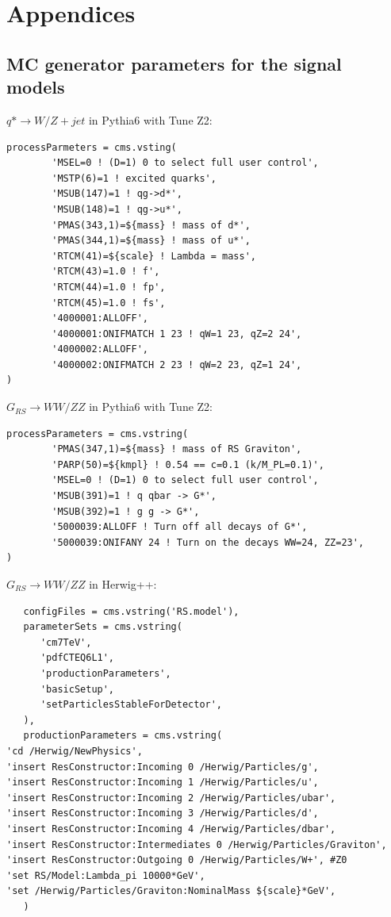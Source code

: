 \section{Appendices}

\subsection{MC generator parameters for the signal models}
$q* \to W/Z + jet$ in Pythia6 with Tune Z2:
\begin{verbatim}
processParmeters = cms.vsting(
        'MSEL=0 ! (D=1) 0 to select full user control',
        'MSTP(6)=1 ! excited quarks',
        'MSUB(147)=1 ! qg->d*',
        'MSUB(148)=1 ! qg->u*',
        'PMAS(343,1)=${mass} ! mass of d*',
        'PMAS(344,1)=${mass} ! mass of u*',
        'RTCM(41)=${scale} ! Lambda = mass',
        'RTCM(43)=1.0 ! f',
        'RTCM(44)=1.0 ! fp',
        'RTCM(45)=1.0 ! fs',
        '4000001:ALLOFF',
        '4000001:ONIFMATCH 1 23 ! qW=1 23, qZ=2 24',
        '4000002:ALLOFF',
        '4000002:ONIFMATCH 2 23 ! qW=2 23, qZ=1 24',
)
\end{verbatim}

$G_{RS} \to WW/ZZ$ in Pythia6 with Tune Z2:
\begin{verbatim}
processParameters = cms.vstring(
        'PMAS(347,1)=${mass} ! mass of RS Graviton',
        'PARP(50)=${kmpl} ! 0.54 == c=0.1 (k/M_PL=0.1)',
        'MSEL=0 ! (D=1) 0 to select full user control',
        'MSUB(391)=1 ! q qbar -> G*',
        'MSUB(392)=1 ! g g -> G*',
        '5000039:ALLOFF ! Turn off all decays of G*',
        '5000039:ONIFANY 24 ! Turn on the decays WW=24, ZZ=23',
)
\end{verbatim}

$G_{RS} \to WW/ZZ$ in Herwig++:
\begin{verbatim}
   configFiles = cms.vstring('RS.model'),
   parameterSets = cms.vstring(
      'cm7TeV',
      'pdfCTEQ6L1',
      'productionParameters',
      'basicSetup',
      'setParticlesStableForDetector',
   ),
   productionParameters = cms.vstring(
'cd /Herwig/NewPhysics',
'insert ResConstructor:Incoming 0 /Herwig/Particles/g',
'insert ResConstructor:Incoming 1 /Herwig/Particles/u',
'insert ResConstructor:Incoming 2 /Herwig/Particles/ubar',
'insert ResConstructor:Incoming 3 /Herwig/Particles/d',
'insert ResConstructor:Incoming 4 /Herwig/Particles/dbar',
'insert ResConstructor:Intermediates 0 /Herwig/Particles/Graviton',
'insert ResConstructor:Outgoing 0 /Herwig/Particles/W+', #Z0
'set RS/Model:Lambda_pi 10000*GeV',
'set /Herwig/Particles/Graviton:NominalMass ${scale}*GeV',
   )
\end{verbatim}

